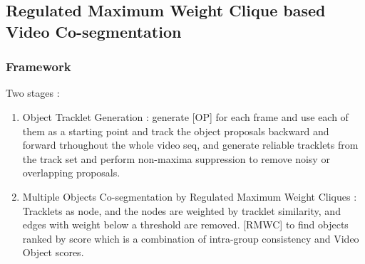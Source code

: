 \documentclass{article}
\begin{document}
\subsection{Regulated Maximum Weight Clique based Video Co-segmentation}
\subsubsection{Framework}
Two stages :
\begin{enumerate}
\item Object Tracklet Generation : generate [OP] for each frame and use each of them as a starting point and track the object proposals backward and forward trhoughout the whole video seq, and generate reliable tracklets from the track set and perform non-maxima suppression to remove noisy or overlapping proposals.
\item Multiple Objects Co-segmentation by Regulated Maximum Weight Cliques : Tracklets as node, and the nodes are weighted by tracklet similarity, and edges with weight below a threshold are removed. [RMWC] to find objects ranked by score which is a combination of intra-group consistency and Video Object scores.
\end{enumerate}
\end{document}

